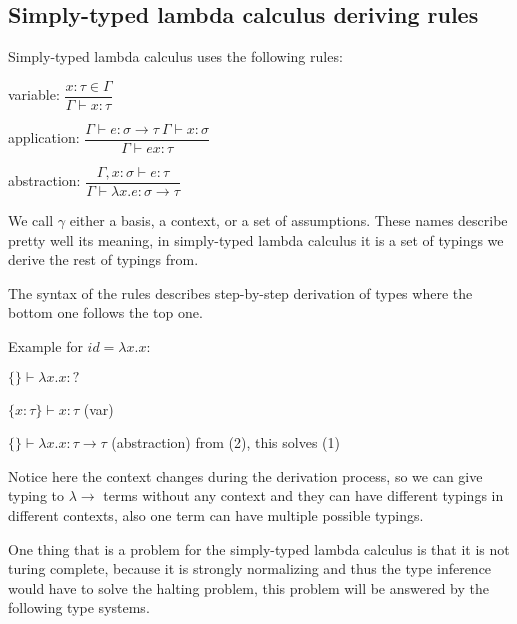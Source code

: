 
\subsection{Simply-typed lambda calculus deriving rules}

Simply-typed lambda calculus uses the following rules:

variable:
$\dfrac{x : \tau \in \Gamma}{\Gamma \vdash x : \tau}$

application:
$\dfrac{\Gamma \vdash e : \sigma \rightarrow \tau \  \Gamma \vdash x : \sigma}{\Gamma \vdash e x : \tau}$

abstraction:
$\dfrac{\Gamma, x : \sigma \vdash e : \tau}{\Gamma \vdash \lambda x . e : \sigma \rightarrow \tau}$

We call $\gamma$ either a basis, a context, or a set of assumptions. These names describe pretty well its meaning, in simply-typed lambda calculus it
is a set of typings we derive the rest of typings from.

The syntax of the rules describes step-by-step derivation of types where the bottom one follows the top one.

Example for $id = \lambda x . x$:

\begin{listing}
    \item $\{\} \vdash \lambda x . x : ?$
    \item $\{x : \tau\} \vdash x : \tau$ (var)
    \item $\{\} \vdash \lambda x . x : \tau \rightarrow \tau$ (abstraction) from (2), this solves (1)
\end{listing}

Notice here the context changes during the derivation process, so we can give typing to $\lambda\rightarrow$ terms without any context
and they can have different typings in different contexts, also one term can have multiple possible typings.


One thing that is a problem for the simply-typed lambda calculus is that it is not turing complete, %
because it is strongly normalizing and thus the type inference would have to solve the halting problem,
this problem will be answered by the following type systems.

